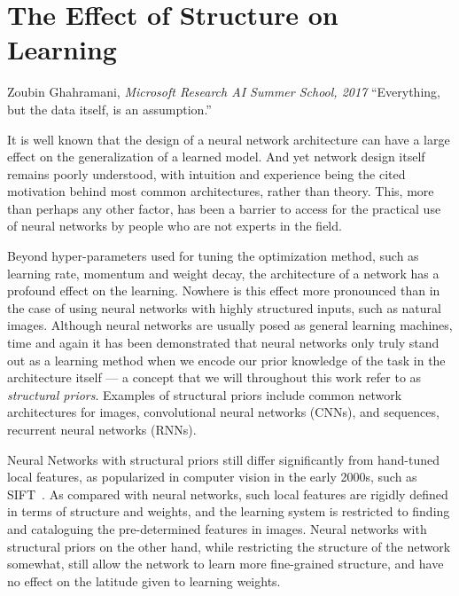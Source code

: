 \documentclass[thesis]{subfiles}
\begin{document}
	\chapter{The Effect of Structure on Learning}\label{motivation}
	\begin{chapquote}{Zoubin Ghahramani, \textit{Microsoft Research AI Summer School, 2017}}
		``Everything, but the data itself, is an assumption.''
	\end{chapquote}
	It is well known that the design of a neural network architecture can have a large effect on the generalization of a learned model. And yet network design itself remains poorly understood, with intuition and experience being the cited motivation behind most common architectures, rather than theory. This, more than perhaps any other factor, has been a barrier to access for the practical use of neural networks by people who are not experts in the field.
	
	Beyond hyper-parameters used for tuning the optimization method, such as learning rate, momentum and weight decay, the architecture of a network has a profound effect on the learning. Nowhere is this effect more pronounced than in the case of using neural networks with highly structured inputs, such as natural images. Although neural networks are usually posed as general learning machines, time and again it has been demonstrated that neural networks only truly stand out as a learning method when we encode our prior knowledge of the task in the architecture itself --- a concept that we will throughout this work refer to as \emph{structural priors}. Examples of structural priors include common network architectures for images, convolutional neural networks (CNNs), and sequences, recurrent neural networks (RNNs).
	
	Neural Networks with structural priors still differ significantly from hand-tuned local features, as popularized in computer vision in the early 2000s, such as SIFT~\citep{Lowe2004}. As compared with neural networks, such local features are rigidly defined in terms of structure and weights, and the learning system is restricted to finding and cataloguing the pre-determined features in images. Neural networks with structural priors on the other hand, while restricting the structure of the network somewhat, still allow the network to learn more fine-grained structure, and have no effect on the latitude given to learning weights.
	
\end{document}

